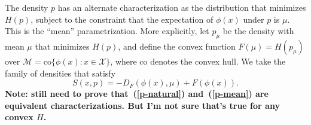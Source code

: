\documentclass[10pt,letterpaper]{article}
\newcommand{\X}{\ensuremath{\mathcal{X}}}
\newcommand{\mM}{\ensuremath{\mathcal{M}}}
\newcommand{\co}{\mbox{co}}
\begin{document}
The density $p$ has an alternate characterization as the distribution that minimizes $H(p)$, subject to the constraint that the expectation of $\phi(x)$ under $p$ is $\mu$. This is the ``mean'' parametrization. More explicitly, let $p_\mu$ be the density with mean $\mu$ that minimizes $H(p)$, and define the convex function $F(\mu) = H(p_{\mu})$ over $\mM = \co\{\phi(x) : x \in \X\}$, where $\co$ denotes the convex hull. We take the family of densities that satisfy
%
\begin{equation} \label{p-mean}
S(x,p) = -D_F(\phi(x), \mu) + F(\phi(x)).
\end{equation}
%
{\bf Note: still need to prove that~(\ref{p-natural}) and~(\ref{p-mean}) are equivalent characterizations. But I'm not sure that's true for any convex $H$.}

\end{document}
